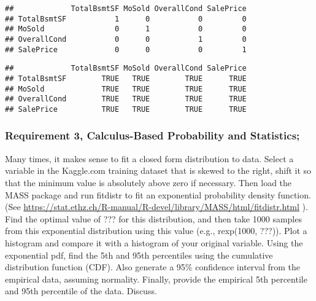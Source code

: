 \documentclass[]{article}
\newenvironment{Shaded}{\begin{snugshade}}{\end{snugshade}}
\newcommand{\DecValTok}[1]{\textcolor[rgb]{0.00,0.00,0.81}{#1}}
\newcommand{\KeywordTok}[1]{\textcolor[rgb]{0.13,0.29,0.53}{\textbf{#1}}}
\newcommand{\NormalTok}[1]{#1}
\newcommand{\OperatorTok}[1]{\textcolor[rgb]{0.81,0.36,0.00}{\textbf{#1}}}
\newcommand{\StringTok}[1]{\textcolor[rgb]{0.31,0.60,0.02}{#1}}
\begin{document}
\begin{verbatim}
##             TotalBsmtSF MoSold OverallCond SalePrice
## TotalBsmtSF           1      0           0         0
## MoSold                0      1           0         0
## OverallCond           0      0           1         0
## SalePrice             0      0           0         1
\end{verbatim}

\begin{Shaded}
\end{Shaded}

\begin{verbatim}
##             TotalBsmtSF MoSold OverallCond SalePrice
## TotalBsmtSF        TRUE   TRUE        TRUE      TRUE
## MoSold             TRUE   TRUE        TRUE      TRUE
## OverallCond        TRUE   TRUE        TRUE      TRUE
## SalePrice          TRUE   TRUE        TRUE      TRUE
\end{verbatim}

\hypertarget{requirement-3-calculus-based-probability-and-statistics}{%
\subsubsection{Requirement 3, Calculus-Based Probability and
Statistics;}\label{requirement-3-calculus-based-probability-and-statistics}}

Many times, it makes sense to fit a closed form distribution to data.
Select a variable in the Kaggle.com training dataset that is skewed to
the right, shift it so that the minimum value is absolutely above zero
if necessary. Then load the MASS package and run fitdistr to fit an
exponential probability density function. (See
\url{https://stat.ethz.ch/R-manual/R-devel/library/MASS/html/fitdistr.html}
). Find the optimal value of ??? for this distribution, and then take
1000 samples from this exponential distribution using this value (e.g.,
rexp(1000, ???)). Plot a histogram and compare it with a histogram of
your original variable. Using the exponential pdf, find the 5th and 95th
percentiles using the cumulative distribution function (CDF). Also
generate a 95\% confidence interval from the empirical data, assuming
normality. Finally, provide the empirical 5th percentile and 95th
percentile of the data. Discuss.
\end{document}
